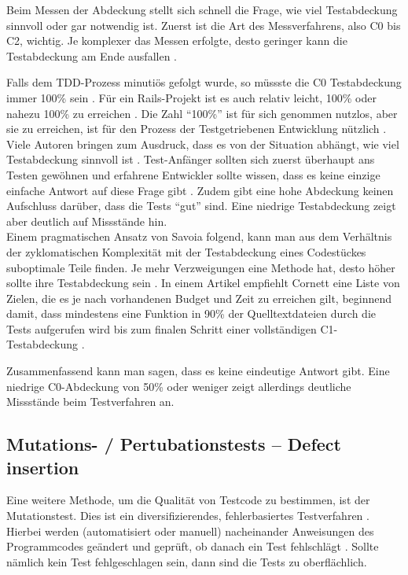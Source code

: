  Beim Messen der Abdeckung stellt sich schnell die Frage, wie viel Testabdeckung sinnvoll oder gar notwendig ist. Zuerst ist die Art des Messverfahrens, also C0 bis C2, wichtig. Je komplexer das Messen erfolgte, desto geringer kann die Testabdeckung am Ende ausfallen \citep{catherine_powell_abakas_2008}.

 Falls dem TDD-Prozess minutiös gefolgt wurde, so müssste die C0 Testabdeckung immer 100\% sein \citep{beck_test_2002}. Für ein Rails-Projekt ist es auch relativ leicht, 100\% oder nahezu 100\% zu erreichen \citep{rappin_rails_2011}. Die Zahl "`100\%"' ist für sich genommen nutzlos, aber sie zu erreichen, ist für den Prozess der Testgetriebenen Entwicklung nützlich \citep[S. 270]{rappin_rails_2011}. \\
 Viele Autoren bringen zum Ausdruck, dass es von der Situation abhängt, wie viel Testabdeckung sinnvoll ist \citep{infoq_2007}. Test-Anfänger sollten sich zuerst überhaupt ans Testen gewöhnen und erfahrene Entwickler sollte wissen, dass es keine einzige einfache Antwort auf diese Frage gibt \citep{infoq_2007}. Zudem gibt eine hohe Abdeckung keinen Aufschluss darüber, dass die Tests "`gut"' sind. Eine niedrige Testabdeckung zeigt aber deutlich auf Missstände hin.\\
 Einem pragmatischen Ansatz von Savoia folgend, kann man aus dem Verhältnis der zyklomatischen Komplexität mit der Testabdeckung eines Codestückes suboptimale Teile finden. Je mehr Verzweigungen eine Methode hat, desto höher sollte ihre Testabdeckung sein \citep{alberto_savoia_code_2007}. In einem Artikel empfiehlt Cornett eine Liste von Zielen, die es je nach vorhandenen Budget und Zeit zu erreichen gilt, beginnend damit, dass mindestens eine Funktion in 90\% der Quelltextdateien durch die Tests aufgerufen wird bis zum finalen Schritt einer vollständigen C1-Testabdeckung \citep{steve_cornett_code_1996}.

 Zusammenfassend kann man sagen, dass es keine eindeutige Antwort gibt. Eine niedrige C0-Abdeckung von 50\% oder weniger zeigt allerdings deutliche Missstände beim Testverfahren an.

 \subsection{Mutations- / Pertubationstests -- Defect insertion}
 \label{sec:mutation}
 Eine weitere Methode, um die Qualität von Testcode zu bestimmen, ist der Mutationstest. Dies ist ein diversifizierendes, fehlerbasiertes Testverfahren \citep{liggesmeyer_modultest_1990}. Hierbei werden (automatisiert oder manuell) nacheinander Anweisungen des Programmcodes geändert und geprüft, ob danach ein Test fehlschlägt \citep{beck_test_2002}. Sollte nämlich kein Test fehlgeschlagen sein, dann sind die Tests zu oberflächlich.

